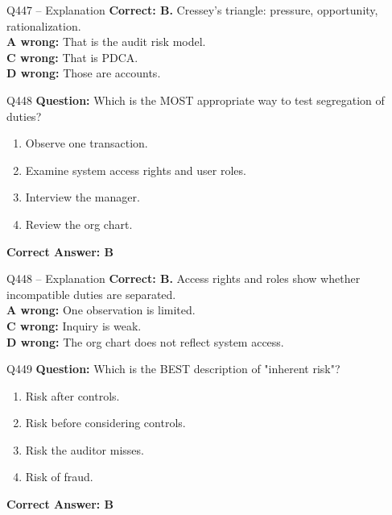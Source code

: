 \documentclass[aspectratio=169,10pt]{beamer}
\begin{document}
	\begin{frame}[t]{Q447 -- Explanation}
		\small
		\textbf{Correct: B.} Cressey's triangle: pressure, opportunity, rationalization. \\[4pt]
		\textbf{A wrong:} That is the audit risk model. \\[2pt]
		\textbf{C wrong:} That is PDCA. \\[2pt]
		\textbf{D wrong:} Those are accounts.
	\end{frame}
	
	\begin{frame}[t]{Q448}
		\small
		\textbf{Question:} Which is the MOST appropriate way to test segregation of duties?
		\begin{enumerate}[label=\Alph*.,itemsep=1pt,topsep=2pt]
			\item Observe one transaction.
			\item Examine system access rights and user roles.
			\item Interview the manager.
			\item Review the org chart.
		\end{enumerate}
		\vspace{4pt}
		\textbf{Correct Answer: B}
	\end{frame}
	
	\begin{frame}[t]{Q448 -- Explanation}
		\small
		\textbf{Correct: B.} Access rights and roles show whether incompatible duties are separated. \\[4pt]
		\textbf{A wrong:} One observation is limited. \\[2pt]
		\textbf{C wrong:} Inquiry is weak. \\[2pt]
		\textbf{D wrong:} The org chart does not reflect system access.
	\end{frame}
	
	\begin{frame}[t]{Q449}
		\small
		\textbf{Question:} Which is the BEST description of "inherent risk"?
		\begin{enumerate}[label=\Alph*.,itemsep=1pt,topsep=2pt]
			\item Risk after controls.
			\item Risk before considering controls.
			\item Risk the auditor misses.
			\item Risk of fraud.
		\end{enumerate}
		\vspace{4pt}
		\textbf{Correct Answer: B}
	\end{frame}
	
\end{document}

